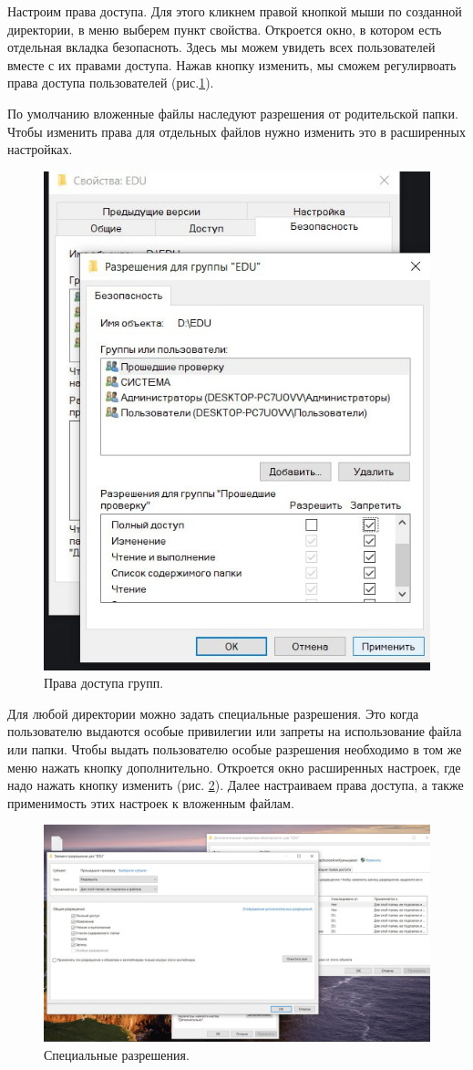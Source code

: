 Настроим права доступа. Для этого кликнем правой кнопкой мыши по созданной директории, в меню выберем пункт свойства. Откроется окно, в котором есть отдельная вкладка безопасноть. Здесь мы можем увидеть всех пользователей вместе с их правами доступа. Нажав кнопку изменить, мы сможем регулирвоать права доступа пользователей (рис.\ref{fig:AccessGroups}).

По умолчанию вложенные файлы наследуют разрешения от родительской папки. Чтобы изменить права для отдельных файлов нужно изменить это в расширенных настройках.

\begin{figure}
    \centering
    \includegraphics[width=0.5\linewidth]{Pic/lab2/photo_2025-05-21_21-18-29.jpg}
    \caption{Права доступа групп.}
    \label{fig:AccessGroups}
\end{figure}

Для любой директории можно задать специальные разрешения. Это когда пользователю выдаются особые привилегии или запреты на использование файла или папки. Чтобы выдать пользователю особые разрешения необходимо в том же меню нажать кнопку дополнительно. Откроется окно расширенных настроек, где надо нажать кнопку изменить (рис. \ref{fig:scpecialaccess}). Далее настраиваем права доступа, а также применимость этих настроек к вложенным файлам.

\begin{figure}
    \centering
    \includegraphics[width=0.8\linewidth]{Pic/lab2/photo_2025-05-21_21-18-31.jpg}
    \caption{Специальные разрешения.}
    \label{fig:scpecialaccess}
\end{figure}

